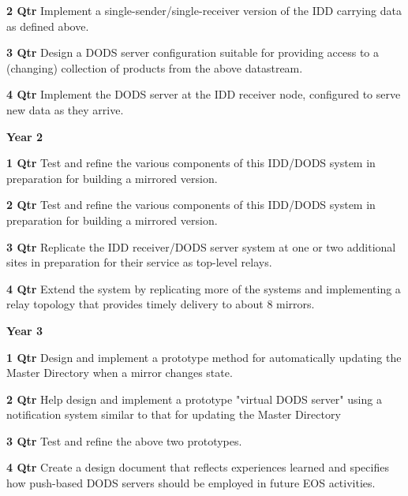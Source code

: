 \documentclass[12pt]{article}
\begin{document}
\begin{description}
\begin{description}
   \item{\bf 2 Qtr} Implement a single-sender/single-receiver version of the
     IDD carrying data as defined above.

   \item{\bf 3 Qtr} Design a DODS server configuration suitable for providing
     access to a (changing) collection of products from the above datastream.
    

   \item{\bf 4 Qtr} Implement the DODS server at the IDD receiver node,
     configured to serve new data as they arrive.

   \end{description}
 \item{\large \bf Year 2}
   \begin{description}
   \item{\bf 1 Qtr} Test and refine the various components of this IDD/DODS
     system in preparation for building a mirrored version.

   \item{\bf 2 Qtr} Test and refine the various components of this IDD/DODS
     system in preparation for building a mirrored version.

   \item{\bf 3 Qtr} Replicate the IDD receiver/DODS server system at one or
     two additional sites in preparation for their service as top-level
     relays.

   \item{\bf 4 Qtr} Extend the system by replicating more of the systems and
     implementing a relay topology that provides timely delivery to about
     8 mirrors.

\end{description}
 \item{\large \bf Year 3}
   \begin{description}
   \item{\bf 1 Qtr} Design and implement a prototype method for automatically
     updating the Master Directory when a mirror changes state.

   \item{\bf 2 Qtr} Help design and implement a prototype "virtual DODS
     server" using a notification system similar to that for updating the
     Master Directory

   \item{\bf 3 Qtr} Test and refine the above two prototypes.

   \item{\bf 4 Qtr} Create a design document that reflects experiences
     learned and specifies how push-based DODS servers should be employed in
     future EOS activities.


\end{description}
\end{description}
\end{document}
